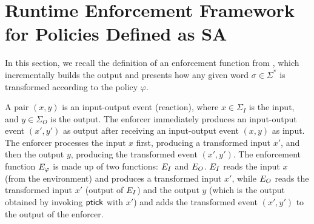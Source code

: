 \section{Runtime Enforcement Framework for Policies Defined as SA}
\label{sec:func:def}
In this section, we recall the definition of an enforcement function from \cite{spin17}, which incrementally builds the output and presents how any given word $\sigma\in\Sigma^*$ is transformed according to the policy $\varphi$. 

A pair $(x,y)$ is an input-output event (reaction), where $x\in\Sigma_I$ is the input, and $y\in\Sigma_O$ is the output.
The enforcer immediately produces an input-output event $(x',y')$ as output after receiving an input-output event $(x,y)$ as input.
The enforcer processes the input $x$ first, producing a transformed input $x'$, and then the output $y$, producing the transformed event $(x',y')$.
The enforcement function $E_{\varphi}$ is made up of two functions: $E_{I}$ and $E_{O}$. $E_{I}$ reads the input $x$ (from the environment) and produces a transformed input $x'$, while $E_{O}$ reads the transformed input $x'$ (output of $E_{I}$) and the output $y$ (which is the output obtained by invoking $\mathsf{ptick}$ with $x'$) and adds the transformed event $(x',y')$ to the output of the enforcer.
